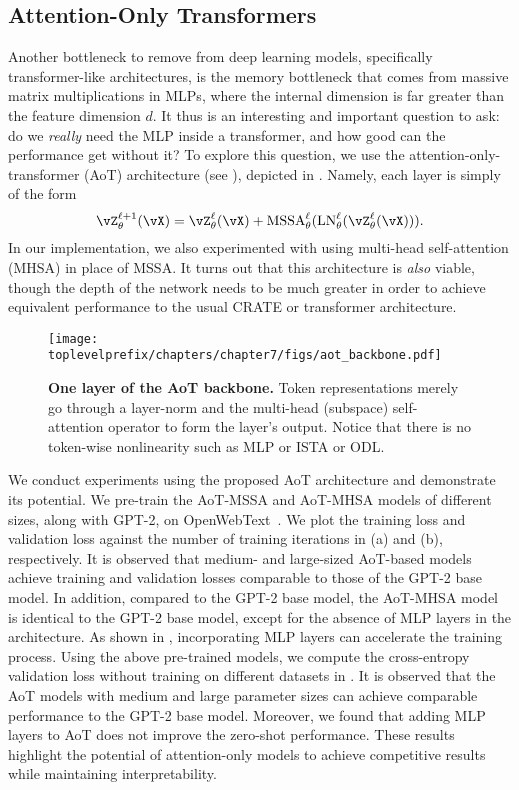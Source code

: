 \documentclass[../../book-main.tex]{subfiles}
\begin{document}
\subsection{Attention-Only Transformers} \label{sub:aot_experiments}

Another bottleneck to remove from deep learning models, specifically transformer-like architectures, is the memory bottleneck that comes from massive matrix multiplications in MLPs, where the internal dimension is far greater than the feature dimension \(d\). It thus is an interesting and important question to ask: do we \textit{really} need the MLP inside a transformer, and how good can the performance get without it? To explore this question, we use the attention-only-transformer (AoT) architecture (see ), depicted in . Namely, each layer is simply of the form 
\begin{equation}
    \vZ_{\theta}^{\ell + 1}(\vX) = \vZ_{\theta}^{\ell}(\vX) + \MSSA_{\theta}^{\ell}(\LN_{\theta}^{\ell}(\vZ_{\theta}^{\ell}(\vX))).
\end{equation}
In our implementation, we also experimented with using multi-head self-attention (MHSA) in place of MSSA. It turns out that this architecture is \textit{also} viable, though the depth of the network needs to be much greater in order to achieve equivalent performance to the usual CRATE or transformer architecture. %

\begin{figure}[!htbp]
    \centering 
    \texttt{[image: \\toplevelprefix/chapters/chapter7/figs/aot\_backbone.pdf]}
    \caption{\small\textbf{One layer of the AoT backbone.} Token representations merely go through a layer-norm and the multi-head (subspace) self-attention operator to form the layer's output. Notice that there is no token-wise nonlinearity such as MLP or ISTA or ODL.}
    \label{fig:aot_backbone}
\end{figure}


We conduct experiments using the proposed AoT architecture and demonstrate its potential. We pre-train the AoT-MSSA and AoT-MHSA models of different sizes, along with GPT-2, on OpenWebText~\citep{Gokaslan2019OpenWeb}. We plot the training loss and validation loss against the number of training iterations in (a) and (b), respectively. It is observed that medium- and large-sized AoT-based models achieve training and validation losses comparable to those of the GPT-2 base model. In addition, compared to the GPT-2 base model, the AoT-MHSA model is identical to the GPT-2 base model, except for the absence of MLP layers in the architecture. As shown in , incorporating MLP layers can accelerate the training process. Using the above pre-trained models, we compute the cross-entropy validation loss without training on different datasets in . It is observed that the AoT models with medium and large parameter sizes can achieve comparable performance to the GPT-2 base model. Moreover, we found that adding MLP layers to AoT does not improve the zero-shot performance. These results highlight the potential of attention-only models to achieve competitive results while maintaining interpretability.  
\end{document}
